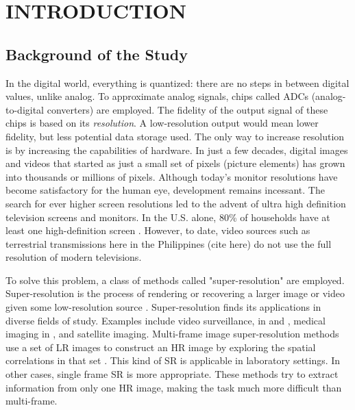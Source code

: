 
\chapter{INTRODUCTION} %

\label{Chapter1} %



\section{Background of the Study}
In the digital world, everything is quantized: there are no steps in between digital values, unlike analog.
To approximate analog signals, chips called ADCs (analog-to-digital converters) are employed. 
The fidelity of the output signal of these chips is based on its \textit{resolution}. 
A low-resolution output would mean lower fidelity, but less potential data storage used.
The only way to increase resolution is by increasing the capabilities of hardware. 
In just a few decades, digital images and videos that started as just a small set of pixels (picture elements) has grown into thousands or millions of pixels.
Although today's monitor resolutions have become satisfactory for the human eye, development remains incessant.
The search for ever higher screen resolutions led to the advent of ultra high definition television screens and monitors. 
In the U.S. alone, 80\% of households have at least one high-definition screen \citep{LRG2015}.
However, to date, video sources such as terrestrial transmissions here in the Philippines (cite here) do not use the full resolution of modern televisions. %

To solve this problem, a class of methods called "super-resolution" are employed.
Super-resolution is the process of rendering or recovering a larger image or video given some low-resolution source \citep{Dong2014}.
Super-resolution finds its applications in diverse fields of study. Examples include video surveillance, in \cite{Caner2003} and \cite{Zhang2010},  medical imaging in \cite{Malczewski2008}, and satellite imaging.
Multi-frame image super-resolution methods use a set of LR images to construct an HR image by exploring the spatial correlations in that set \citep{Cheng2013}.
This kind of SR is applicable in laboratory settings.
In other cases, single frame SR is more appropriate. 
These methods try to extract information from only one HR image, making the task much more difficult than multi-frame.


